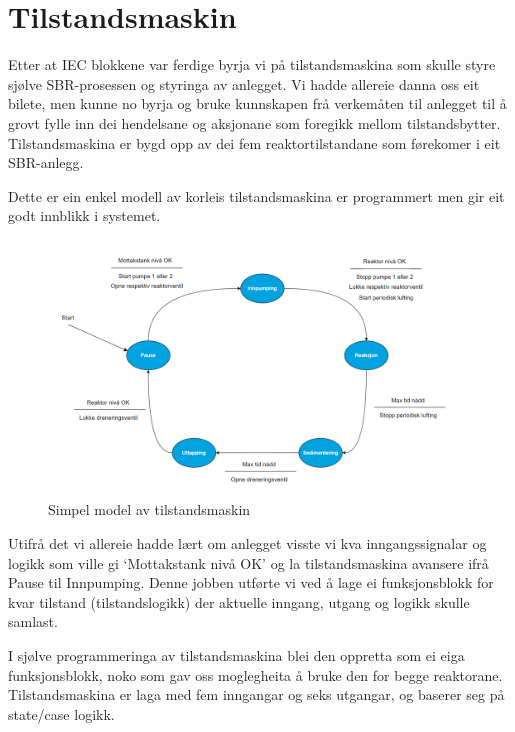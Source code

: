 \section{Tilstandsmaskin}
\thispagestyle{fancy}

Etter at IEC blokkene var ferdige byrja vi på tilstandsmaskina som skulle styre sjølve SBR-prosessen
og styringa av anlegget. Vi hadde allereie danna oss eit bilete, men kunne no byrja og bruke kunnskapen frå verkemåten til anlegget
til å grovt fylle inn dei hendelsane og aksjonane som foregikk mellom tilstandsbytter. 
Tilstandsmaskina er bygd opp av dei fem reaktortilstandane som førekomer i eit SBR-anlegg.

Dette er ein enkel modell av korleis tilstandsmaskina er programmert men gir eit godt innblikk i systemet.

\begin{figure}[htbp]
    \centering
    \includegraphics[width=1\textwidth]{Figurar/Simpel tilstandsmaskin.png}
    \caption{Simpel model av tilstandsmaskin}\label{fig:reaktorsoner}
\end{figure}

Utifrå det vi allereie hadde lært om anlegget visste vi kva inngangssignalar og logikk som ville gi
`Mottakstank nivå OK' og la tilstandsmaskina avansere ifrå Pause til Innpumping. Denne jobben utførte vi ved å lage ei
funksjonsblokk for kvar tilstand (tilstandslogikk) der aktuelle inngang, utgang og logikk skulle samlast.

\newpage

I sjølve programmeringa av tilstandsmaskina blei den oppretta som ei eiga funksjonsblokk, noko som gav oss moglegheita å bruke den for begge reaktorane.
Tilstandsmaskina er laga med fem inngangar og seks utgangar, og baserer seg på state/case logikk.

